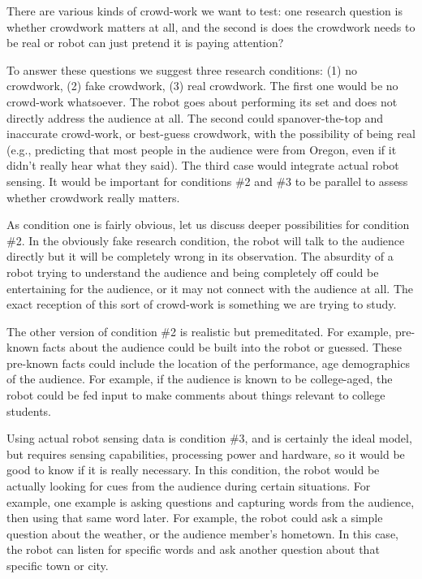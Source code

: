 \documentclass[onecolumn, draftclsnofoot,10pt, compsoc]{IEEEtran}
\begin{document}
There are various kinds of crowd-work we want to test: one research question is whether crowdwork matters at all, and the second is does the crowdwork needs to be real or robot can just pretend it is paying attention? 

To answer these questions we suggest three research conditions: (1) no crowdwork, (2) fake crowdwork, (3) real crowdwork. The first one would be no crowd-work whatsoever. The robot goes about performing its set and does not directly address the audience at all. The second could spanover-the-top and inaccurate crowd-work, or best-guess crowdwork, with the possibility of being real (e.g., predicting that most people in the audience were from Oregon, even if it didn't really hear what they said). The third case would integrate actual robot sensing. It would be important for conditions \#2 and \#3 to be parallel to assess whether crowdwork really matters.

As condition one is fairly obvious, let us discuss deeper possibilities for condition \#2. In the obviously fake research condition, the robot will talk to the audience directly but it will be completely wrong in its observation. The absurdity of a robot trying to understand the audience and being completely off could be entertaining for the audience, or it may not connect with the audience at all. The exact reception of this sort of crowd-work is something we are trying to study.

The other version of condition \#2 is realistic but premeditated. For example, pre-known facts about the audience could be built into the robot or guessed. These pre-known facts could include the location of the performance, age demographics of the audience. For example, if the audience is known to be college-aged, the robot could be fed input to make comments about things relevant to college students.

Using actual robot sensing data is condition \#3, and is certainly the ideal model, but requires sensing capabilities, processing power and hardware, so it would be good to know if it is really necessary. In this condition, the robot would be actually looking for cues from the audience during certain situations. For example, one example is asking questions and capturing words from the audience, then using that same word later. For example, the robot could ask a simple question about the weather, or the audience member's hometown. In this case, the robot can listen for specific words and ask another question about that specific town or city. 
\end{document}
